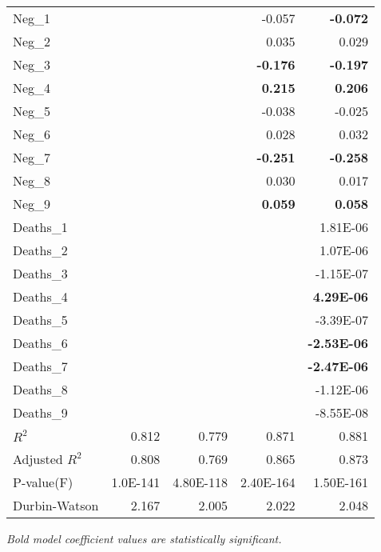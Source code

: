 \begin{longtable}[c]{@{}lrrrr@{}}
Neg\_1 &  &  & -0.057 & \textbf{-0.072} \\
Neg\_2 &  &  & 0.035 & 0.029 \\
Neg\_3 &  &  & \textbf{-0.176} & \textbf{-0.197} \\
Neg\_4 &  &  & \textbf{0.215} & \textbf{0.206} \\
Neg\_5 &  &  & -0.038 & -0.025 \\
Neg\_6 &  &  & 0.028 & 0.032 \\
Neg\_7 &  &  & \textbf{-0.251} & \textbf{-0.258} \\
Neg\_8 &  &  & 0.030 & 0.017 \\
Neg\_9 &  &  & \textbf{0.059} & \textbf{0.058} \\
Deaths\_1 &  &  &  & 1.81E-06 \\
Deaths\_2 &  &  &  & 1.07E-06 \\
Deaths\_3 &  &  &  & -1.15E-07 \\
Deaths\_4 &  &  &  & \textbf{4.29E-06} \\
Deaths\_5 &  &  &  & -3.39E-07 \\
Deaths\_6 &  &  &  & \textbf{-2.53E-06} \\
Deaths\_7 &  &  &  & \textbf{-2.47E-06} \\
Deaths\_8 &  &  &  & -1.12E-06 \\
Deaths\_9 &  &  &  & -8.55E-08 \\
$R^2$ & 0.812 & 0.779 & 0.871 & 0.881 \\
Adjusted $R^2$ & 0.808 & 0.769 & 0.865 & 0.873 \\
P-value(F) & 1.0E-141 & 4.80E-118 & 2.40E-164 & 1.50E-161 \\
Durbin-Watson & 2.167 & 2.005 & 2.022 & 2.048 \\* \bottomrule
\end{longtable}
\emph{Bold model coefficient values are statistically significant.}



